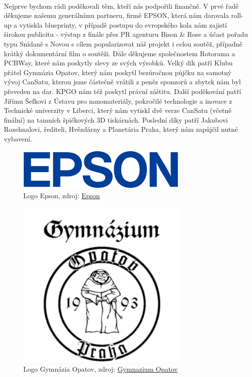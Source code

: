 \documentclass[a4paper]{report}
\begin{document}
\paragraph{} Nejprve bychom rádi poděkovali těm, kteří nás podpořili finančně. V prvé řadě děkujeme našemu generálnímu partneru, firmě EPSON, která nám darovala roll-up a vytiskla blueprinty, v případě postupu do evropského kola nám zajistí širokou publicitu - výstup z finále přes PR agenturu Bison \& Rose a účast pořadu typu Snídaně s Novou s cílem popularizovat náš projekt i celou soutěž, případně krátký dokumentární film o soutěži.  Dále děkujeme společnostem Rotorama a PCBWay, které nám poskytly slevy ze svých výrobků. Velký dík patří Klubu přátel Gymnázia Opatov, který nám poskytl bezúročnou půjčku na samotný vývoj CanSatu, kterou jsme částečně vrátili z peněz sponzorů a zbytek nám byl převeden na dar. KPGO nám též poskytl právní záštitu. Další poděkování patří Jiřímu Šefkovi z Ústavu pro nanomateriály, pokročilé technologie a inovace z Technické univerzity v Liberci, který nám vytiskl dvě verze CanSatu (včetně finální) na tamních špičkových 3D tiskárnách. Poslední díky patří Jakubovi Rozehnalovi, řediteli, Hvězdárny a Planetária Praha, který nám zapůjčil nutné vybavení.
\begin{figure}[H]
\centering
\caption{Logo Epson, zdroj: 
\href{https://www.epson.cz}{Epson}}
\includegraphics[width=240pt]{epson.png}
\end{figure}
\begin{figure}[H]
\centering
\caption{Logo Gymnázia Opatov, zdroj: 
\href{http://gymnazium-opatov.cz}{Gymnazium Opatov}}
\includegraphics[width=240pt]{LogoGO.png}
\end{figure}
\end{document}
